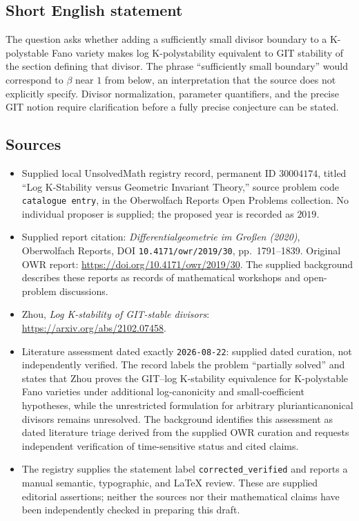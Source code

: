 \documentclass[11pt]{article}
\begin{document}
\subsection{Short English statement}
The question asks whether adding a sufficiently small divisor boundary to a K-polystable Fano variety makes log K-polystability equivalent to GIT stability of the section defining that divisor. The phrase ``sufficiently small boundary'' would correspond to \(\beta\) near \(1\) from below, an interpretation that the source does not explicitly specify. Divisor normalization, parameter quantifiers, and the precise GIT notion require clarification before a fully precise conjecture can be stated.
\subsection{Sources}
\begin{itemize}
\item Supplied local UnsolvedMath registry record, permanent ID \(30004174\), titled ``Log K-Stability versus Geometric Invariant Theory,'' source problem code \texttt{catalogue entry}, in the Oberwolfach Reports Open Problems collection. No individual proposer is supplied; the proposed year is recorded as \(2019\).
\item Supplied report citation: \emph{Differentialgeometrie im Großen (2020)}, Oberwolfach Reports, DOI \texttt{10.4171/owr/2019/30}, pp.\ 1791--1839. Original OWR report: \url{https://doi.org/10.4171/owr/2019/30}. The supplied background describes these reports as records of mathematical workshops and open-problem discussions.
\item Zhou, \emph{Log K-stability of GIT-stable divisors}: \url{https://arxiv.org/abs/2102.07458}.
\item Literature assessment dated exactly \texttt{2026-08-22}: supplied dated curation, not independently verified. The record labels the problem ``partially solved'' and states that Zhou proves the GIT--log K-stability equivalence for K-polystable Fano varieties under additional log-canonicity and small-coefficient hypotheses, while the unrestricted formulation for arbitrary plurianticanonical divisors remains unresolved. The background identifies this assessment as dated literature triage derived from the supplied OWR curation and requests independent verification of time-sensitive status and cited claims.
\item The registry supplies the statement label \texttt{corrected\_verified} and reports a manual semantic, typographic, and LaTeX review. These are supplied editorial assertions; neither the sources nor their mathematical claims have been independently checked in preparing this draft.
\end{itemize}
\end{document}
